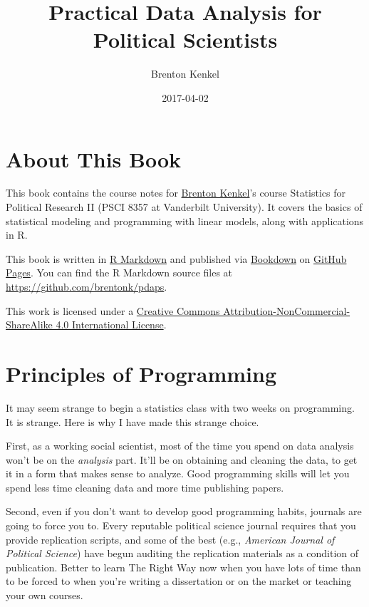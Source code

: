 \documentclass[12pt,oneside,openany]{book}
\title{Practical Data Analysis for Political Scientists}
\author{Brenton Kenkel}
\date{2017-04-02}
\begin{document}
\maketitle

{
\setcounter{tocdepth}{1}
\tableofcontents
}
\chapter{About This Book}\label{about-this-book}

This book contains the course notes for
\href{http://bkenkel.com}{Brenton Kenkel}'s course Statistics for
Political Research II (PSCI 8357 at Vanderbilt University). It covers
the basics of statistical modeling and programming with linear models,
along with applications in R.

This book is written in \href{http://rmarkdown.rstudio.com}{R Markdown}
and published via \href{https://bookdown.org}{Bookdown} on
\href{https://pages.github.com}{GitHub Pages}. You can find the R
Markdown source files at \url{https://github.com/brentonk/pdaps}.

This work is licensed under a
\href{http://creativecommons.org/licenses/by-nc-sa/4.0/}{Creative
Commons Attribution-NonCommercial-ShareAlike 4.0 International License}.

\hypertarget{programming}{\chapter{Principles of
Programming}\label{programming}}

It may seem strange to begin a statistics class with two weeks on
programming. It is strange. Here is why I have made this strange choice.

First, as a working social scientist, most of the time you spend on data
analysis won't be on the \emph{analysis} part. It'll be on obtaining and
cleaning the data, to get it in a form that makes sense to analyze. Good
programming skills will let you spend less time cleaning data and more
time publishing papers.

Second, even if you don't want to develop good programming habits,
journals are going to force you to. Every reputable political science
journal requires that you provide replication scripts, and some of the
best (e.g., \emph{American Journal of Political Science}) have begun
auditing the replication materials as a condition of publication. Better
to learn The Right Way now when you have lots of time than to be forced
to when you're writing a dissertation or on the market or teaching your
own courses.
\end{document}
